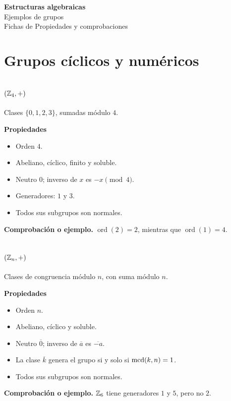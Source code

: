 \documentclass[11pt,a4paper]{article}
\newcommand{\ord}{\operatorname{ord}}\newcommand{\gen}[1]{\langle #1\rangle}
\begin{document}
\begin{center}{\LARGE\bfseries Estructuras algebraicas}\\[.4em]{\Large Ejemplos de grupos}\\[.4em]{\large Fichas de Propiedades y comprobaciones}\end{center}
\tableofcontents\newpage
\section{Grupos cíclicos y numéricos}

\subsection{$(\mathbb{Z}_4,+)$}
\begin{ejemplo}
Clases $\{0,1,2,3\}$, sumadas módulo $4$.
\end{ejemplo}
\textbf{Propiedades}
\begin{itemize}
\item Orden $4$.
\item Abeliano, cíclico, finito y soluble.
\item Neutro $0$; inverso de $x$ es $-x\pmod 4$.
\item Generadores: $1$ y $3$.
\item Todos sus subgrupos son normales.
\end{itemize}
\textbf{Comprobación o ejemplo.} $\ord(2)=2$, mientras que $\ord(1)=4$.

\subsection{$(\mathbb{Z}_n,+)$}
\begin{ejemplo}
Clases de congruencia módulo $n$, con suma módulo $n$.
\end{ejemplo}
\textbf{Propiedades}
\begin{itemize}
\item Orden $n$.
\item Abeliano, cíclico y soluble.
\item Neutro $\overline0$; inverso de $\overline a$ es $\overline{-a}$.
\item La clase $\overline k$ genera el grupo si y solo si $\operatorname{mcd}(k,n)=1$.
\item Todos sus subgrupos son normales.
\end{itemize}
\textbf{Comprobación o ejemplo.} $\mathbb{Z}_6$ tiene generadores $1$ y $5$, pero no $2$.
\end{document}
